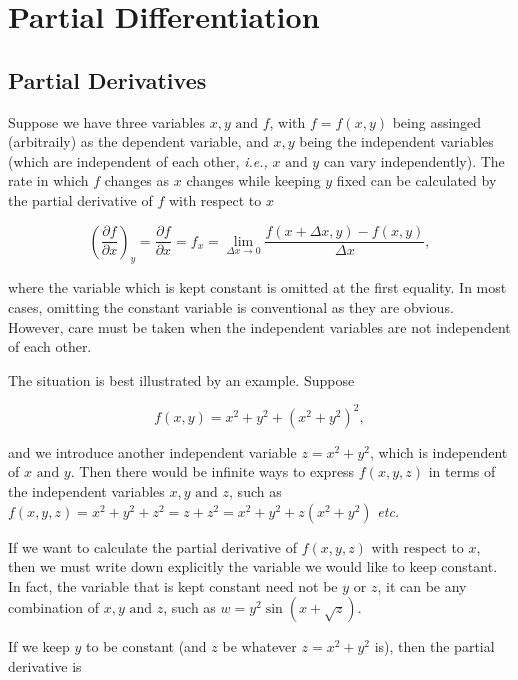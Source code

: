\documentclass[english,a4paper,12pt]{report}
\begin{document}
\section{Partial Differentiation}

\subsection{Partial Derivatives}

Suppose we have three variables \(x,y \text { and } f\), with \(f = f(x,y)\) being assinged (arbitraily) as the dependent variable, and \(x,y\) being the independent variables (which are independent of each other, \textit{i.e.,} \(x \text { and } y\) can vary independently). The rate in which \(f\) changes as \(x\) changes while keeping \(y\) fixed can be calculated by the partial derivative of \(f\) with respect to \(x\)

\begin{equation}
    \left( \frac{\partial f}{\partial x} \right)_{y} = \frac{\partial f}{\partial x} = f_{x}  = \lim_{\Delta x \to 0} \frac{f(x+\Delta x,y) - f(x,y)}{\Delta x},
\end{equation}

where the variable which is kept constant is omitted at the first equality. In most cases, omitting the constant variable is conventional as they are obvious. However, care must be taken when the independent variables are not independent of each other. 

The situation is best illustrated by an example. Suppose

\begin{equation}
	f(x,y) = x^2+y^2+(x^2+y^2)^2,
\end{equation}

and we introduce another independent variable \(z = x^2+y^2\), which is independent of \(x \text { and } y\). Then there would be infinite ways to express \(f(x,y,z)\) in terms of the independent variables \(x,y \text { and } z\), such as \(f(x,y,z) = x^2+y^2+z^2 = z+z^2 = x^2+y^2+z(x^2+y^2)\) \textit{etc.} 

If we want to calculate the partial derivative of \(f(x,y,z)\) with respect to \(x\), then we must write down explicitly the variable we would like to keep constant. In fact, the variable that is kept constant need not be \(y \text { or } z\), it can be any combination of \(x,y \text { and } z\), such as \(w = y^2\sin (x+\sqrt{z} )\). 

If we keep \(y\) to be constant (and \(z\) be whatever \(z = x^2+y^2\) is), then the partial derivative is 
\end{document}
